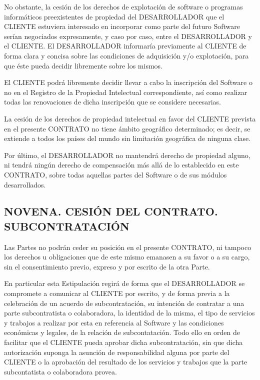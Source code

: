\documentclass[a4paper,11pt]{report}
\begin{document}
	No obstante, la cesión de los derechos de explotación de software o
	programas informáticos preexistentes de propiedad del DESARROLLADOR que
	el CLIENTE estuviera interesado en incorporar como parte del futuro
	Software serían negociados expresamente, y caso por caso, entre el
	DESARROLLADOR y el CLIENTE. El DESARROLLADOR informaría previamente al
	CLIENTE de forma clara y concisa sobre las condiciones de adquisición
	y/o explotación, para que éste pueda decidir libremente sobre los
	mismos.

	El CLIENTE podrá libremente decidir llevar a cabo la inscripción del
	Software o no en el Registro de la Propiedad Intelectual
	correspondiente, así como realizar todas las renovaciones de dicha
	inscripción que se considere necesarias.

	La cesión de los derechos de propiedad intelectual en favor del CLIENTE
	prevista en el presente CONTRATO no tiene ámbito geográfico determinado;
	es decir, se extiende a todos los países del mundo sin limitación
	geográfica de ninguna clase.

	Por último, el DESARROLLADOR no mantendrá derecho de propiedad alguno,
	ni tendrá ningún derecho de compensación más allá de lo establecido en
	este CONTRATO, sobre todas aquellas partes del Software o de sus módulos
	desarrollados.

	\subsection*{NOVENA. CESIÓN DEL CONTRATO. SUBCONTRATACIÓN}

	Las Partes no podrán ceder su posición en el presente CONTRATO, ni
	tampoco los derechos u obligaciones que de este mismo emanasen a su
	favor o a su cargo, sin el consentimiento previo, expreso y por escrito
	de la otra Parte.

	En particular esta Estipulación regirá de forma que el DESARROLLADOR se
	compromete a comunicar al CLIENTE por escrito, y de forma previa a la
	celebración de un acuerdo de subcontratación, su intención de contratar
	a una parte subcontratista o colaboradora, la identidad de la misma, el
	tipo de servicios y trabajos a realizar por esta en referencia al
	Software y las condiciones económicas y legales, de la relación de
	subcontatación. Todo ello en orden de facilitar que el CLIENTE pueda
	aprobar dicha subcontratación, sin que dicha autorización suponga la
	asunción de responsabilidad alguna por parte del CLIENTE o la aprobación
	del resultado de los servicios y trabajos que la parte subcontatista o
	colaboradora provea.
\end{document}
